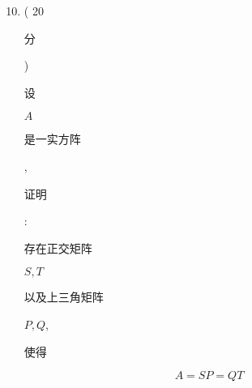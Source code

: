 \documentclass[10pt]{article}
\begin{document}
\begin{enumerate}
  \setcounter{enumi}{9}
  \item ( 20 \begin{CJK}{UTF8}{mj}分\end{CJK}) \begin{CJK}{UTF8}{mj}设\end{CJK} $A$ \begin{CJK}{UTF8}{mj}是一实方阵\end{CJK}, \begin{CJK}{UTF8}{mj}证明\end{CJK}: \begin{CJK}{UTF8}{mj}存在正交矩阵\end{CJK} $S, T$ \begin{CJK}{UTF8}{mj}以及上三角矩阵\end{CJK} $P, Q$, \begin{CJK}{UTF8}{mj}使得\end{CJK}
\end{enumerate}
$$
A=S P=Q T
$$
\end{document}
